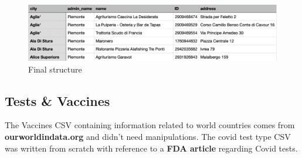 \documentclass{article}[IEEEtran]
\begin{document}
\begin{figure}[H]
\begin{center}
\includegraphics[width=0.5\linewidth, frame]{restaurants.png}
\caption{Final structure}
\end{center}
\end{figure}

\newpage

\subsection{Tests \& Vaccines}

The Vaccines CSV containing information related to world countries comes from \textbf{ourworldindata.org} \cite{ourworldindata} and didn't need manipulations. The covid test type CSV was written from scratch with reference to a \textbf{FDA article} \cite{fdatesting} regarding Covid tests.
\end{document}
